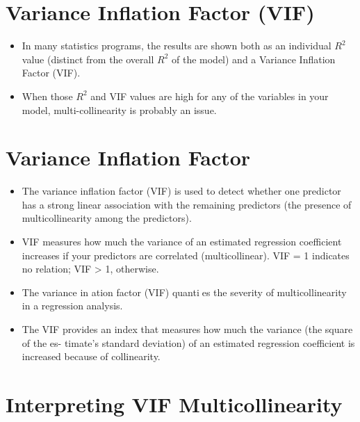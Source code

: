 \documentclass[]{report}
\begin{document}
\section*{Variance Inflation Factor (VIF)}
\begin{itemize}

\item In many statistics programs, the results are shown both
as an individual $R^2$ value (distinct from the overall $R^2$ of the model) and a Variance Inflation
Factor (VIF). 
\item When those $R^2$ and VIF values are high for any of the variables in your model,
multi-collinearity is probably an issue.

\end{itemize}




\section*{Variance Inflation Factor}
\begin{itemize}
\item The variance inflation factor (VIF) is used to detect whether one predictor has a strong linear
association with the remaining predictors (the presence of multicollinearity among the
predictors). 
\item VIF measures how much the variance of an estimated regression coefficient
increases if your predictors are correlated (multicollinear).
VIF = 1 indicates no relation; VIF > 1, otherwise.
\item The variance in
ation factor (VIF) quanties the severity of multicollinearity in a regression
analysis.
\item The VIF provides an index that measures how much the variance (the square of the es-
timate's standard deviation) of an estimated regression coefficient is increased because of
collinearity.

\end{itemize}



\section{Interpreting VIF Multicollinearity}
\end{document}

